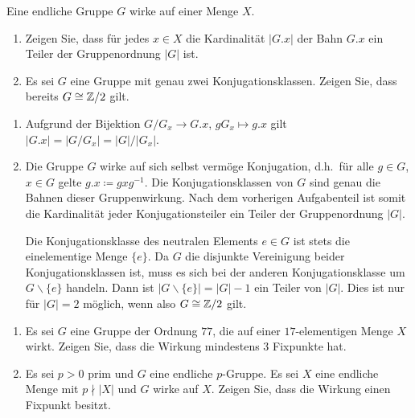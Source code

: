\begin{question}[subtitle = Genau zwei Konjugationsklassen]
  Eine endliche Gruppe $G$ wirke auf einer Menge $X$.
  \begin{enumerate}
    \item
      Zeigen Sie, dass für jedes $x \in X$ die Kardinalität $|G.x|$ der Bahn $G.x$ ein Teiler der Gruppenordnung $|G|$ ist.
    \item
      Es sei $G$ eine Gruppe mit genau zwei Konjugationsklassen.
      Zeigen Sie, dass bereits $G \cong \mathbb{Z}/2$ gilt.
  \end{enumerate}
\end{question}


\begin{solution}
  \begin{enumerate}
    \item
      Aufgrund der Bijektion $G/G_x \to G.x$, $gG_x \mapsto g.x$ gilt $|G.x| = |G/G_x| = |G|/|G_x|$.
    \item
      Die Gruppe $G$ wirke auf sich selbst vermöge Konjugation, d.h.\ für alle $g \in G$, $x \in G$ gelte $g.x \coloneqq gxg^{-1}$.
      Die Konjugationsklassen von $G$ sind genau die Bahnen dieser Gruppenwirkung.
      Nach dem vorherigen Aufgabenteil ist somit die Kardinalität jeder Konjugationsteiler ein Teiler der Gruppenordnung $|G|$.
      
      Die Konjugationsklasse des neutralen Elements $e \in G$ ist stets die einelementige Menge $\{e\}$.
      Da $G$ die disjunkte Vereinigung beider Konjugationsklassen ist, muss es sich bei der anderen Konjugationsklasse um $G \smallsetminus \{e\}$ handeln.
      Dann ist $|G \smallsetminus \{e\}| = |G|-1$ ein Teiler von $|G|$.
      Dies ist nur für $|G| = 2$ möglich, wenn also $G \cong \mathbb{Z}/2$ gilt.
  \end{enumerate}
\end{solution}


\begin{question}[subtitle = Bahnenkombinatorik]
  \begin{enumerate}
    \item
      Es sei $G$ eine Gruppe der Ordnung $77$, die auf einer $17$-elementigen Menge $X$ wirkt.
      Zeigen Sie, dass die Wirkung mindestens $3$ Fixpunkte hat.
    \item
      Es sei $p > 0$ prim und $G$ eine endliche $p$-Gruppe.
      Es sei $X$ eine endliche Menge mit $p \nmid |X|$ und $G$ wirke auf $X$.
      Zeigen Sie, dass die Wirkung einen Fixpunkt besitzt.
  \end{enumerate}
\end{question}


